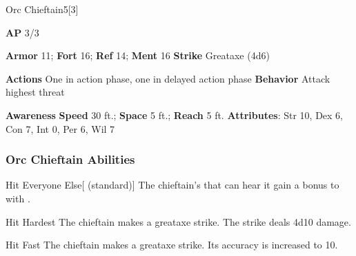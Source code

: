 \begin{monsection}{Orc Chieftain}{5}[3]
\vspace{-1em}\vspace{-1em}
\begin{spellcontent}
\begin{spelltargetinginfo}
{\textbf{AP} 3/3}

\pari \textbf{Armor} 11;
\textbf{Fort} 16;
\textbf{Ref} 14;
\textbf{Ment} 16
\pari \textbf{Strike} Greataxe  (4d6)


\pari \textbf{Actions} One in action phase, one in delayed action phase
\pari \textbf{Behavior} Attack highest threat
\end{spelltargetinginfo}
\end{spellcontent}

\begin{monsterfooter}
\pari \textbf{Awareness} 
\pari \textbf{Speed} 30 ft.;
\textbf{Space} 5 ft.;
\textbf{Reach} 5 ft.
\pari \textbf{Attributes}:
Str 10,
Dex 6,
Con 7,
Int 0,
Per 6,
Wil 7
\end{monsterfooter}
\end{monsection}


\subsubsection{Orc Chieftain Abilities}

\begin{freeability}{Hit Everyone Else}[ (standard)]
The chieftain's  that can hear it gain a  bonus to  with .
\end{freeability}

\vspace{0.5em}
\begin{freeability}{Hit Hardest}
The chieftain makes a greataxe strike.
The strike deals 4d10 damage.
\end{freeability}

\vspace{0.5em}
\begin{freeability}{Hit Fast}
The chieftain makes a greataxe strike.
Its accuracy is increased to 10.
\end{freeability}

